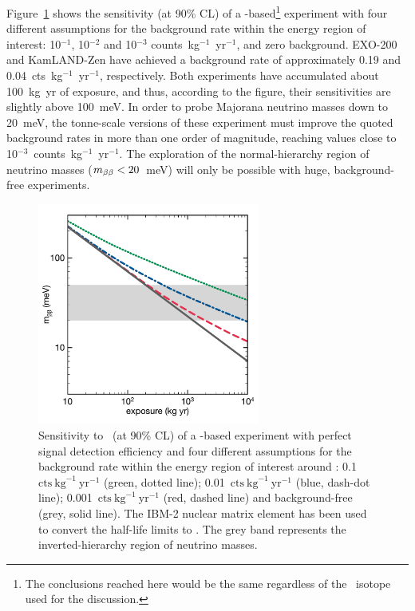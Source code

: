 \documentclass{PoS}
\begin{document}
Figure~\ref{fig:SensitivityXeVsBackground} shows the sensitivity (at 90\% CL) of a \XE-based\footnote{The conclusions reached here would be the same regardless of the \bb\ isotope used for the discussion.} experiment with four different assumptions for the background rate within the energy region of interest: 10$^{-1}$, 10$^{-2}$ and 10$^{-3}$ counts~kg$^{-1}$~yr$^{-1}$, and zero background. EXO-200 and KamLAND-Zen have achieved a background rate of approximately 0.19 and 0.04~cts~kg$^{-1}$~yr$^{-1}$, respectively. Both experiments have accumulated about 100~kg~yr of exposure, and thus, according to the figure, their sensitivities are slightly above 100~meV. In order to probe Majorana neutrino masses down to 20~meV, the tonne-scale versions of these experiment must improve the quoted background rates in more than one order of magnitude, reaching values close to 10$^{-3}$~counts~kg$^{-1}$~yr$^{-1}$. The exploration of the normal-hierarchy region of neutrino masses ($m_{\beta\beta}<20$~meV) will only be possible with huge, background-free experiments.


\begin{figure}
\centering
\includegraphics[width=0.65\textwidth]{img/SensitivityXeVsBackground.pdf}
\caption{Sensitivity to \mbb\ (at 90\% CL) of a \XE-based experiment with perfect signal detection efficiency and four different assumptions for the background rate within the energy region of interest around \Qbb: 0.1~$\mathrm{cts}~\mathrm{kg}^{-1}~\mathrm{yr}^{-1}$ (green, dotted line); 0.01~$\mathrm{cts}~\mathrm{kg}^{-1}~\mathrm{yr}^{-1}$ (blue, dash-dot line); 0.001~$\mathrm{cts}~\mathrm{kg}^{-1}~\mathrm{yr}^{-1}$ (red, dashed line) and background-free (grey, solid line). The IBM-2 nuclear matrix element has been used to convert the half-life limits to \mbb. The grey band represents the inverted-hierarchy region of neutrino masses.} \label{fig:SensitivityXeVsBackground}
\end{figure}
\end{document}

